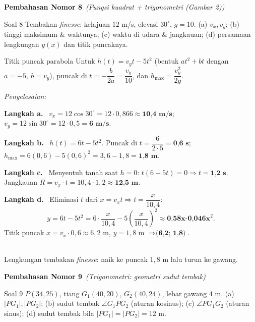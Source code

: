 \documentclass[11pt,a4paper]{article}
\newcommand{\jawab}{\par\smallskip\noindent\textit{\textcolor{oranye}{Penyelesaian:}}\par\smallskip}
\newcommand{\langkah}[1]{\par\smallskip\noindent\textbf{\textcolor{biru}{Langkah #1.}}\ }
\newcommand{\nomorjudul}[2]{\par\bigskip\noindent%
  {\large\bfseries\color{ungu}Pembahasan Nomor #1}\ {\normalfont\itshape\color{gray}(#2)}\par\nopagebreak\smallskip}
\begin{document}
\nomorjudul{8}{Fungsi kuadrat + trigonometri (Gambar 2)}
\begin{soalbox}{Soal 8}
Tembakan \emph{finesse}: kelajuan $12$ m/s, elevasi $30^\circ$, $g=10$.
(a) $v_x,v_y$; (b) tinggi maksimum \& waktunya; (c) waktu di udara \& jangkauan;
(d) persamaan lengkungan $y(x)$ dan titik puncaknya.
\end{soalbox}

\begin{ingat}{Titik puncak parabola}
Untuk $h(t)=v_y t-5t^2$ (bentuk $at^2+bt$ dengan $a=-5,\ b=v_y$), puncak di
$t=-\dfrac{b}{2a}=\dfrac{v_y}{10}$, dan $h_{\max}=\dfrac{v_y^{2}}{2g}$.
\end{ingat}

\jawab
\langkah{a} $v_x=12\cos30^\circ=12\cdot0{,}866\approx\textbf{10{,}4 m/s}$;\quad
$v_y=12\sin30^\circ=12\cdot0{,}5=\textbf{6 m/s}$.

\langkah{b} $h(t)=6t-5t^2$. Puncak di $t=\dfrac{6}{2\cdot5}=\textbf{0{,}6 s}$;
$h_{\max}=6(0{,}6)-5(0{,}6)^2=3{,}6-1{,}8=\textbf{1{,}8 m}$.

\langkah{c} Menyentuh tanah saat $h=0$: $t(6-5t)=0\Rightarrow t=\textbf{1{,}2 s}$.
Jangkauan $R=v_x\cdot t=10{,}4\cdot1{,}2\approx\textbf{12{,}5 m}$.

\langkah{d} Eliminasi $t$ dari $x=v_x t \Rightarrow t=\dfrac{x}{10{,}4}$:
\[
y=6t-5t^2=6\cdot\frac{x}{10{,}4}-5\left(\frac{x}{10{,}4}\right)^2
 \approx \textbf{0{,}58x-0{,}046x}^2.
\]
Titik puncak $x=v_x\cdot0{,}6\approx6{,}2$ m, $y=1{,}8$ m $\Rightarrow \textbf{(6{,}2;\ 1{,}8)}$.

\begin{center}
\\
{\small Lengkungan tembakan \emph{finesse}: naik ke puncak $1{,}8$ m lalu turun ke gawang.}
\end{center}

\nomorjudul{9}{Trigonometri: geometri sudut tembak}
\begin{soalbox}{Soal 9}
$P(34,25)$, tiang $G_1(40,20)$, $G_2(40,24)$, lebar gawang $4$ m.
(a) $|PG_1|,|PG_2|$; (b) sudut tembak $\angle G_1PG_2$ (aturan kosinus);
(c) $\angle PG_1G_2$ (aturan sinus); (d) sudut tembak bila $|PG_1|=|PG_2|=12$ m.
\end{soalbox}
\end{document}
